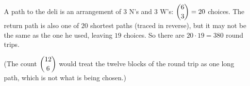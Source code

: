 A path to the deli is an arrangement of $3$ N's and $3$ W's: $\dbinom63=20$ choices. The return path is also one of $20$ shortest paths (traced in reverse), but it may not be the same as the one he used, leaving $19$ choices. So there are $20\cdot19=\boxed{380}$ round trips.

(The count $\dbinom{12}{6}$ would treat the twelve blocks of the round trip as one long path, which is not what is being chosen.)
